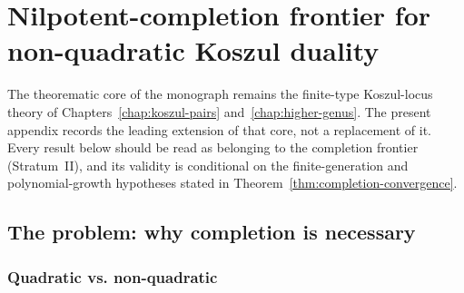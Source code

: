 
\chapter{Nilpotent-completion frontier for non-quadratic Koszul duality}
\label{app:nilpotent-completion}


\begin{abstract}
This appendix develops a frontier completion package extending the
finite-type geometric Koszul formalism to a larger class of filtered
chiral algebras under finite-generation and polynomial-growth
hypotheses.  For non-quadratic chiral algebras such as Virasoro and
W-algebras, the bar construction produces an infinite coalgebra that
requires completion to yield a usable completed curved bar model and
dual shadow data.  The appendix records the $I$-adic framework, the
finite-stage infrastructure, and the exact missing lemmas that separate
the standard completed examples from a universal completion theorem.
\end{abstract}

\begin{remark}
\label{rem:nilpotent-completion-dependency}
The theorematic core of the monograph remains the finite-type
Koszul-locus theory of Chapters~\ref{chap:koszul-pairs}
and~\ref{chap:higher-genus}.  The present appendix records the leading
extension of that core, not a replacement of it.  Every result below
should be read as belonging to the completion frontier (Stratum~II),
and its validity is conditional on the finite-generation and
polynomial-growth hypotheses stated in
Theorem~\ref{thm:completion-convergence}.
\end{remark}

\section{The problem: why completion is necessary}

\subsection{Quadratic vs. non-quadratic}

